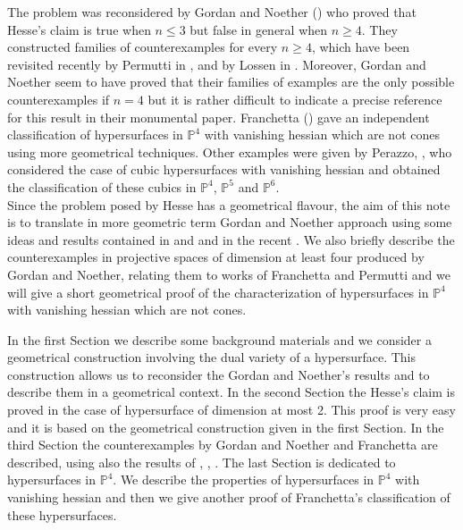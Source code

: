 \documentclass[11pt,a4paper]{amsart}
\newcounter{num}
\newcommand{\PP}{ \mathbb{P}}
\begin{document}
The problem was reconsidered by Gordan and Noether (\cite{Gordan
Noether}) who proved that Hesse's claim is true when $n\leq 3$ but
false in general when $n\geq 4$. They constructed families of
counterexamples for every $n\geq 4$, which have been revisited
recently by Permutti in \cite{Permutti1}, \cite{Permutti2} and by
Lossen in \cite{Lossen}. Moreover, Gordan and Noether seem to have proved that their
families of examples  are the only possible counterexamples if $n=4$ but it is
rather difficult to indicate a precise reference for this result in their monumental paper.
Franchetta (\cite{Franchetta}) gave an independent classification
of hypersurfaces in $\mathbb{P}^4$ with vanishing hessian which
are not cones using more geometrical techniques. Other examples
were given by Perazzo, \cite{Perazzo}, who considered the case of
cubic hypersurfaces with vanishing hessian and obtained
the classification of these cubics in $\PP^4$, $\PP^5$ and
$\PP^6$. \\
Since the problem posed by Hesse has a  geometrical flavour, the
aim of this note is to translate in more geometric term Gordan and
Noether approach using some ideas and results contained in
\cite{Gordan Noether} and \cite{Lossen} and in the recent
\cite{CilibertoRussoSimis}. We also briefly describe the
counterexamples in projective spaces of dimension at least four
produced by Gordan and Noether, relating them  to works of
Franchetta and Permutti and we will give a short geometrical proof
of the characterization of hypersurfaces in $\mathbb{P}^4$  with
vanishing hessian which are not cones.

In the first Section we describe some background materials and we
consider a geometrical construction involving the dual variety of
a hypersurface. This construction allows us to reconsider the
Gordan and Noether's results and to describe them in a geometrical
context. In the second Section the Hesse's claim is proved in the
case of hypersurface of dimension at most 2. This proof is very
easy and it is based on the geometrical construction given in the
first Section. In the third Section the counterexamples by Gordan
and Noether and Franchetta are described, using also the results
of \cite{Permutti1}, \cite{Permutti2}, \cite{CilibertoRussoSimis}.
The last Section is dedicated to  hypersurfaces in $\PP^4$. We
describe the properties of  hypersurfaces in $\PP^4$ with
vanishing hessian and then we give another proof of  Franchetta's
classification of these hypersurfaces.\\
\medskip
\end{document}
